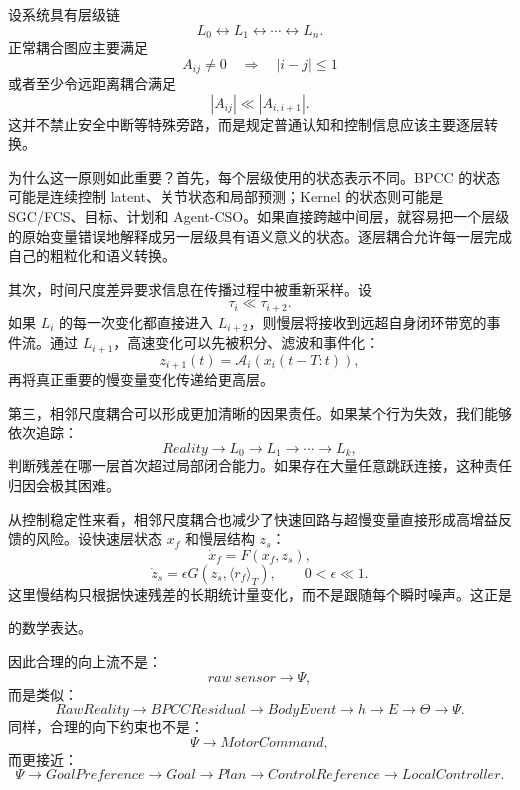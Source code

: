 设系统具有层级链
\[
L_0\leftrightarrow L_1\leftrightarrow \cdots\leftrightarrow L_n.
\]
正常耦合图应主要满足
\begin{equation}
A_{ij}\neq 0
\quad\Longrightarrow\quad
|i-j|\leq 1
\end{equation}
或者至少令远距离耦合满足
\begin{equation}
|A_{ij}|
\ll
|A_{i,i+1}|.
\end{equation}
这并不禁止安全中断等特殊旁路，而是规定普通认知和控制信息应该主要逐层转换。

为什么这一原则如此重要？首先，每个层级使用的状态表示不同。BPCC 的状态可能是连续控制 latent、关节状态和局部预测；Kernel 的状态则可能是 SGC/FCS、目标、计划和 Agent-CSO。如果直接跨越中间层，就容易把一个层级的原始变量错误地解释成另一层级具有语义意义的状态。逐层耦合允许每一层完成自己的粗粒化和语义转换。

其次，时间尺度差异要求信息在传播过程中被重新采样。设
\[
\tau_i\ll\tau_{i+2}.
\]
如果 $L_i$ 的每一次变化都直接进入 $L_{i+2}$，则慢层将接收到远超自身闭环带宽的事件流。通过 $L_{i+1}$，高速变化可以先被积分、滤波和事件化：
\begin{equation}
z_{i+1}(t)
=
\mathcal A_i
\left(
x_i(t-T:t)
\right),
\end{equation}
再将真正重要的慢变量变化传递给更高层。

第三，相邻尺度耦合可以形成更加清晰的因果责任。如果某个行为失效，我们能够依次追踪：
\[
Reality
\rightarrow
L_0
\rightarrow
L_1
\rightarrow
\cdots
\rightarrow
L_k,
\]
判断残差在哪一层首次超过局部闭合能力。如果存在大量任意跳跃连接，这种责任归因会极其困难。

从控制稳定性来看，相邻尺度耦合也减少了快速回路与超慢变量直接形成高增益反馈的风险。设快速层状态 $x_f$ 和慢层结构 $z_s$：
\begin{equation}
\dot{x}_f
=
F(x_f,z_s),
\end{equation}
\begin{equation}
\dot{z}_s
=
\epsilon G(z_s,\langle r_f\rangle_T),
\qquad
0<\epsilon\ll 1.
\end{equation}
这里慢结构只根据快速残差的长期统计量变化，而不是跟随每个瞬时噪声。这正是
\begin{statementbox}
\centering
{}
\end{statementbox}
的数学表达。

因此合理的向上流不是：
\[
raw\ sensor
\rightarrow
\Psi,
\]
而是类似：
\[
RawReality
\rightarrow
BPCCResidual
\rightarrow
BodyEvent
\rightarrow
h
\rightarrow
E
\rightarrow
\Theta
\rightarrow
\Psi.
\]
同样，合理的向下约束也不是：
\[
\Psi
\rightarrow
MotorCommand,
\]
而更接近：
\[
\Psi
\rightarrow
GoalPreference
\rightarrow
Goal
\rightarrow
Plan
\rightarrow
ControlReference
\rightarrow
LocalController.
\]

